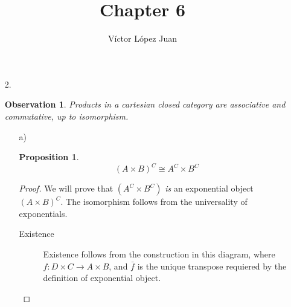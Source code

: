\documentclass[notitlepage]{article}
\author{Víctor López Juan}
\title{Chapter 6}
\newtheorem{observation}{Observation}
\newtheorem{proposition}{Proposition}
\begin{document}
\maketitle

\begin{enumerate}
     
   \item[ 2.]

     \begin{observation}\label{obs:commassoc}
       Products in a cartesian closed category are associative and
       commutative, up to isomorphism. 
     \end{observation}
     
     \begin{enumerate}

       \item[a)]

         \begin{proposition}
           
         $$(A \times B)^C \cong A^C \times B^C$$

         \end{proposition}

         \begin{proof}

           We will prove that $(A^C \times B^C)$ {\em is} an exponential
           object $(A \times B)^C$. The isomorphism follows from the
           universality of exponentials.

           \begin{description}
             
             \item[Existence]
               
               Existence follows from the construction in this
               diagram, where $f : D \times C → A \times B$, and
               $\bar{f}$ is the unique transpose requiered by the definition
               of exponential object.

\end{description}
\end{proof}
\end{enumerate}
\end{enumerate}
\end{document}

